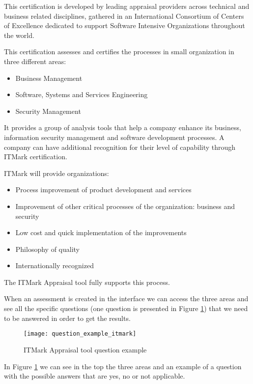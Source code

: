 This certification is developed by leading appraisal providers across technical and business related disciplines, gathered in an International Consortium of Centers of Excellence dedicated to support Software Intensive Organizations throughout the world.

This certification assesses and certifies the processes in small organization in three different areas:
\begin{itemize}
	\item Business Management
	\item Software, Systems and Services Engineering
	\item Security Management
\end{itemize}

It provides a group of analysis tools that help a company enhance its business, information security management and software development processes. A company can have additional recognition for their level of capability through ITMark certification.

ITMark will provide organizations:
\begin{itemize}
	\item Process improvement of product development and services
	\item Improvement of other critical processes of the organization: business and security
	\item Low cost and quick implementation of the improvements
	\item Philosophy of quality
	\item Internationally recognized
\end{itemize}

The ITMark Appraisal tool fully supports this process.


When an assessment is created in the interface we can access the three areas and see all the specific questions (one question is presented in Figure \ref{fig:itmark_question}) that we need to be answered in order to get the results.

\begin{figure}[h]
	\begin{center}
		\leavevmode
		\texttt{[image: question\_example\_itmark]}
		\caption{ITMark Appraisal tool question example}
		\label{fig:itmark_question}
	\end{center}
\end{figure}

In Figure \ref{fig:itmark_question} we can see in the top the three areas and an example of a question with the possible answers that are yes, no or not applicable.

